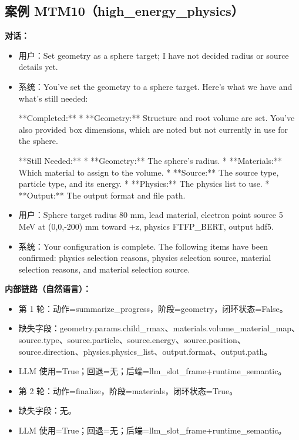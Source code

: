 \documentclass[11pt]{ctexart}
\begin{document}
\subsection{案例 MTM10（high\_energy\_physics）}
\textbf{对话：}
\begin{itemize}
\item 用户：Set geometry as a sphere target; I have not decided radius or source details yet.
\item 系统：You've set the geometry to a sphere target. Here's what we have and what's still needed:

**Completed:**
*   **Geometry:** Structure and root volume are set. You've also provided box dimensions, which are noted but not currently in use for the sphere.

**Still Needed:**
*   **Geometry:** The sphere's radius.
*   **Materials:** Which material to assign to the volume.
*   **Source:** The source type, particle type, and its energy.
*   **Physics:** The physics list to use.
*   **Output:** The output format and file path.
\item 用户：Sphere target radius 80 mm, lead material, electron point source 5 MeV at (0,0,-200) mm toward +z, physics FTFP\_BERT, output hdf5.
\item 系统：Your configuration is complete. The following items have been confirmed: physics selection reasons, physics selection source, material selection reasons, and material selection source.
\end{itemize}
\textbf{内部链路（自然语言）：}
\begin{itemize}
\item 第 1 轮：动作=summarize\_progress，阶段=geometry，闭环状态=False。
\item 缺失字段：geometry.params.child\_rmax、materials.volume\_material\_map、source.type、source.particle、source.energy、source.position、source.direction、physics.physics\_list、output.format、output.path。
\item LLM 使用=True；回退=无；后端=llm\_slot\_frame+runtime\_semantic。
\item 第 2 轮：动作=finalize，阶段=materials，闭环状态=True。
\item 缺失字段：无。
\item LLM 使用=True；回退=无；后端=llm\_slot\_frame+runtime\_semantic。
\end{itemize}
\end{document}
